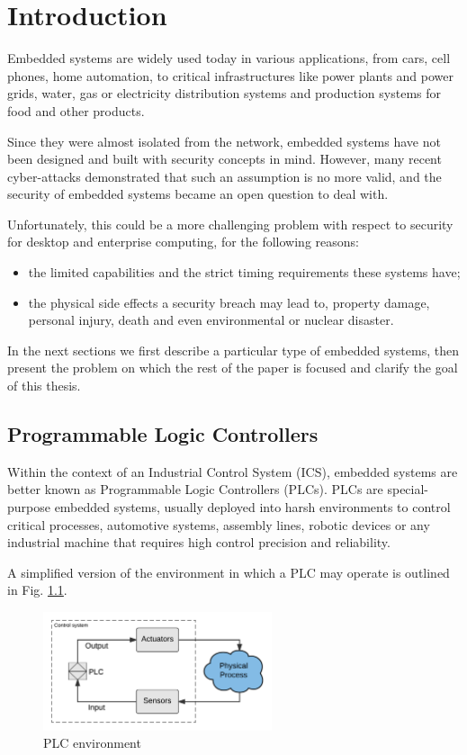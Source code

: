 \chapter{Introduction}
\label{chap:intro}

Embedded systems are widely used today in various applications, from cars, cell phones, home automation, to critical infrastructures
like power plants and power grids, water, gas or electricity distribution systems and production systems for food and other products.

Since they were almost isolated from the network, embedded systems have not been designed and built with security concepts in mind.
However, many recent cyber-attacks demonstrated that such an assumption is no more valid, and the security of embedded systems became an open question to deal with.

Unfortunately, this could be a more challenging problem with respect to security for desktop and enterprise computing, for the following reasons:
\begin{itemize}[itemsep=2pt,topsep=0pt]
	\item the limited capabilities and the strict timing requirements these systems have;
	\item the physical side effects a security breach may lead to, \eg property damage, personal injury, death and even environmental or nuclear disaster.
\end{itemize}

In the next sections we first describe a particular type of embedded systems, then present the problem on which the rest of the paper is focused
and clarify the goal of this thesis.


\section{Programmable Logic Controllers}

Within the context of an Industrial Control System (ICS), embedded systems are better known as Programmable Logic Controllers (PLCs).
PLCs are special-purpose embedded systems, usually deployed into harsh environments to control critical processes,
\eg automotive systems, assembly lines, robotic devices or any industrial machine that requires high control precision and reliability.

A simplified version of the environment in which a PLC may operate is outlined in Fig. \ref{fig:plc_env}.
\begin{figure}[h]
\centerline{\includegraphics[width=0.6\textwidth]{res/plc_env}}
\caption{PLC environment\label{fig:plc_env}}
\end{figure}

